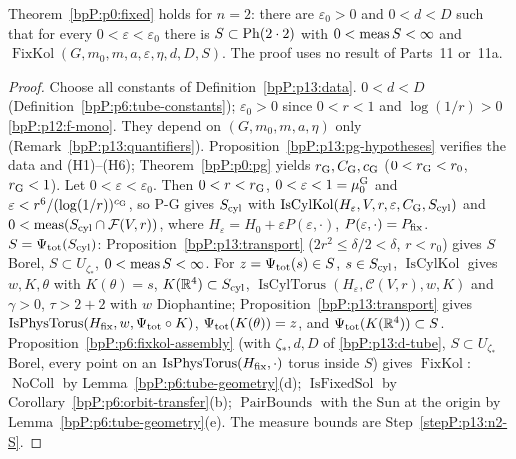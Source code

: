 \begin{theorem}[P-FIXED for $n=2$, route (c)]\label{bpP:p13:n2}
Theorem~\ref{bpP:p0:fixed} holds for $n=2$: there are $\varepsilon_0>0$ and $0<d<D$ such that for every $0<\varepsilon<\varepsilon_0$ there is $S\subset\mathrm{Ph}(2\cdot2)$ with $0<\operatorname{meas} S<\infty$ and $\operatorname{FixKol}(G,m_0,m,a,\varepsilon,\eta,d,D,S)$. The proof uses no result of Parts~11 or~11a.
\end{theorem}
\begin{proof}
\label{stepP:p13:n2-const} Choose all constants of Definition~\ref{bpP:p13:data}. $0<d<D$ (Definition~\ref{bpP:p6:tube-constants}); $\varepsilon_0>0$ since $0<r<1$ and $\log(1/r)>0$ \ref{bpP:p12:f-mono}. They depend on $(G,m_0,m,a,\eta)$ only (Remark~\ref{bpP:p13:quantifiers}).
\label{stepP:p13:n2-pg} Proposition~\ref{bpP:p13:pg-hypotheses} verifies the data and (H1)--(H6); Theorem~\ref{bpP:p0:pg} yields $r_{\rm G},C_{\rm G},c_{\rm G}$ ($0<r_{\rm G}<r_0$, $r_{\rm G}<1$).
\label{stepP:p13:n2-mu} Let $0<\varepsilon<\varepsilon_0$. Then $0<r<r_{\rm G}$, $0<\varepsilon<1=\mu_0^{\rm G}$ and $\varepsilon<r^6/(\log(1/r))^{c_{\rm G}}$, so P-G gives $S_{\rm cyl}$ with $\operatorname{IsCylKol}(H_\varepsilon,V,r,\varepsilon,C_{\rm G},S_{\rm cyl})$ and $0<\operatorname{meas}(S_{\rm cyl}\cap\mathcal F(V,r))$, where $H_\varepsilon=H_0+\varepsilon P(\varepsilon,\cdot)$, $P(\varepsilon,\cdot)=P_{\rm fix}$.
\label{stepP:p13:n2-S} $S=\Psi_{\rm tot}(S_{\rm cyl})$: Proposition~\ref{bpP:p13:transport} ($2r^2\le\delta/2<\delta$, $r<r_0$) gives $S$ Borel, $S\subset U_{\zeta_*}$, $0<\operatorname{meas} S<\infty$.
\label{stepP:p13:n2-tori} For $z=\Psi_{\rm tot}(s)\in S$, $s\in S_{\rm cyl}$, $\operatorname{IsCylKol}$ gives $w,K,\theta$ with $K(\theta)=s$, $K(\mathbb{R}^4)\subset S_{\rm cyl}$, $\operatorname{IsCylTorus}(H_\varepsilon,\mathcal C(V,r),w,K)$ and $\gamma>0$, $\tau>2+2$ with $w$ Diophantine; Proposition~\ref{bpP:p13:transport} gives $\operatorname{IsPhysTorus}(H_{\rm fix},w,\Psi_{\rm tot}\circ K)$, $\Psi_{\rm tot}(K(\theta))=z$, and $\Psi_{\rm tot}(K(\mathbb{R}^4))\subset S$.
\label{stepP:p13:n2-phys} Proposition~\ref{bpP:p6:fixkol-assembly} (with $\zeta_*,d,D$ of \ref{bpP:p13:d-tube}, $S\subset U_{\zeta_*}$ Borel, every point on an $\operatorname{IsPhysTorus}(H_{\rm fix},\cdot)$ torus inside $S$) gives $\operatorname{FixKol}$: $\operatorname{NoColl}$ by Lemma~\ref{bpP:p6:tube-geometry}(d); $\operatorname{IsFixedSol}$ by Corollary~\ref{bpP:p6:orbit-transfer}(b); $\operatorname{PairBounds}$ with the Sun at the origin by Lemma~\ref{bpP:p6:tube-geometry}(e). The measure bounds are Step~\ref{stepP:p13:n2-S}.
\end{proof}


